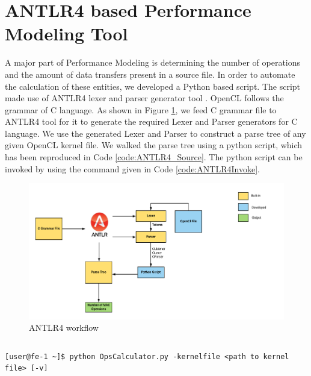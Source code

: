 \section{ANTLR4 based Performance Modeling Tool}

A major part of Performance Modeling is determining the number of operations and the amount of data transfers present in a source file. In order to automate the calculation of these entities, we developed a Python based script. The script made use of ANTLR4 lexer and parser generator tool \cite{ANTLR4_Article}. OpenCL follows the grammar of C language. As shown in Figure \ref{fig:ANTLR4}, we feed C grammar file to ANTLR4 tool for it to generate the required Lexer and Parser generators for C language. We use the generated Lexer and Parser to construct a parse tree of any given OpenCL kernel file. We walked the parse tree using a python script, which has been reproduced in Code \ref{code:ANTLR4_Source}. The python script can be invoked by using the command given in Code \ref{code:ANTLR4Invoke}.

\begin{figure}[!bhtp]
  \centering
  \includegraphics[scale=1.2,width=\textwidth]{img/Antlr4.png}
  \caption{ANTLR4 workflow}
  \label{fig:ANTLR4}
\end{figure}
\pagebreak
\inputminted[breaklines=true]{Python}{img/Antlr4_Python.py}



\begin{code}[!htb]
 \begin{verbatim}
[user@fe-1 ~]$ python OpsCalculator.py -kernelfile <path to kernel file> [-v]
\end{verbatim}
\caption{Command to invoke ANTLR4 based Performance Modeling Tool}
\label{code:ANTLR4Invoke}
\end{code}




